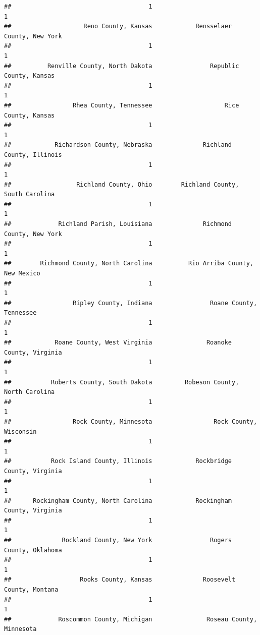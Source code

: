 \documentclass[
]{article}
\begin{document}
\begin{verbatim}
##                                      1                                      1 
##                    Reno County, Kansas            Rensselaer County, New York 
##                                      1                                      1 
##          Renville County, North Dakota                Republic County, Kansas 
##                                      1                                      1 
##                 Rhea County, Tennessee                    Rice County, Kansas 
##                                      1                                      1 
##            Richardson County, Nebraska              Richland County, Illinois 
##                                      1                                      1 
##                  Richland County, Ohio        Richland County, South Carolina 
##                                      1                                      1 
##             Richland Parish, Louisiana              Richmond County, New York 
##                                      1                                      1 
##        Richmond County, North Carolina          Rio Arriba County, New Mexico 
##                                      1                                      1 
##                 Ripley County, Indiana                Roane County, Tennessee 
##                                      1                                      1 
##            Roane County, West Virginia               Roanoke County, Virginia 
##                                      1                                      1 
##           Roberts County, South Dakota         Robeson County, North Carolina 
##                                      1                                      1 
##                 Rock County, Minnesota                 Rock County, Wisconsin 
##                                      1                                      1 
##           Rock Island County, Illinois            Rockbridge County, Virginia 
##                                      1                                      1 
##      Rockingham County, North Carolina            Rockingham County, Virginia 
##                                      1                                      1 
##              Rockland County, New York                Rogers County, Oklahoma 
##                                      1                                      1 
##                   Rooks County, Kansas              Roosevelt County, Montana 
##                                      1                                      1 
##             Roscommon County, Michigan               Roseau County, Minnesota 

\end{verbatim}
\end{document}
